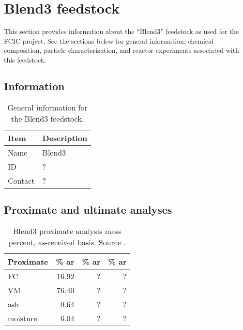 
\section{Blend3 feedstock}

This section provides information about the ``Blend3'' feedstock as used for the FCIC project. See the sections below for general information, chemical composition, particle characterization, and reactor experiments associated with this feedstock.

\subsection{Information}

\begin{table}[H]
    \centering
    \caption{General information for the Blend3 feedstock.}
    \begin{tabular}{ll}
        \toprule
        Item    & Description \\
        \midrule
        Name    & Blend3 \\
        ID      & ? \\
        Contact & ? \\
        \bottomrule
    \end{tabular}
\end{table}

\subsection{Proximate and ultimate analyses}

\begin{table}[H]
    \centering
    \caption{Blend3 proximate analysis mass percent, as-received basis. Source \cite{Choratch-2017}.}
    \begin{tabular}{lrrr}
        \toprule
        Proximate & \% ar & \% ar & \% ar \\
        \midrule
        FC        & 16.92 & ? & ? \\
        VM        & 76.40 & ? & ? \\
        ash       & 0.64  & ? & ? \\
        moisture  & 6.04  & ? & ? \\
        \bottomrule
    \end{tabular}
\end{table}

